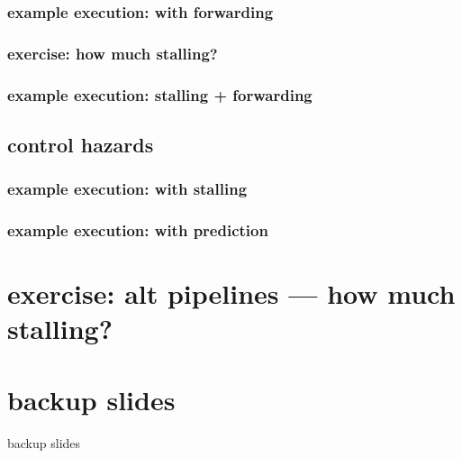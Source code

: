 \subsubsection{example execution: with forwarding}

\subsubsection{exercise: how much stalling?}


\subsubsection{example execution: stalling + forwarding}

\subsection{control hazards}

\subsubsection{example execution: with stalling}

\subsubsection{example execution: with prediction}

\section{exercise: alt pipelines --- how much stalling?}


\section{backup slides}
\begin{frame}{backup slides}
\end{frame}


